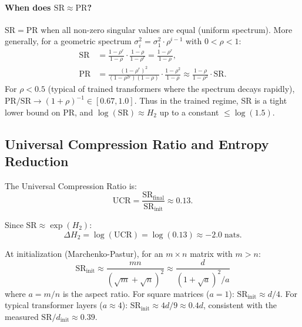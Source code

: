 \paragraph{When does $\mathrm{SR} \approx \mathrm{PR}$?}
$\mathrm{SR} = \mathrm{PR}$ when all non-zero singular values are equal (uniform spectrum). More generally, for a geometric spectrum $\sigma_i^2 = \sigma_1^2 \cdot \rho^{i-1}$ with $0 < \rho < 1$:
\begin{align}
    \mathrm{SR} &= \frac{1-\rho^r}{1-\rho} \cdot \frac{1-\rho}{1-\rho^r} = \frac{1-\rho^r}{1-\rho}, \\
    \mathrm{PR} &= \frac{(1-\rho^r)^2}{(1-\rho^{2r})(1-\rho)} \cdot \frac{1-\rho^2}{1-\rho} \approx \frac{1-\rho}{1-\rho^2} \cdot \mathrm{SR}.
\end{align}
For $\rho < 0.5$ (typical of trained transformers where the spectrum decays rapidly), $\mathrm{PR}/\mathrm{SR} \to (1+\rho)^{-1} \in [0.67, 1.0]$. Thus in the trained regime, SR is a tight lower bound on PR, and $\log(\mathrm{SR}) \approx H_2$ up to a constant $\leq \log(1.5)$.

\subsection{Universal Compression Ratio and Entropy Reduction}

The Universal Compression Ratio is:
\begin{equation}
    \mathrm{UCR} = \frac{\mathrm{SR}_{\mathrm{final}}}{\mathrm{SR}_{\mathrm{init}}} \approx 0.13.
\end{equation}

Since $\mathrm{SR} \approx \exp(H_2)$:
\begin{equation}
    \Delta H_2 = \log(\mathrm{UCR}) = \log(0.13) \approx -2.0 \;\text{nats}.
\end{equation}

At initialization (Marchenko-Pastur), for an $m \times n$ matrix with $m > n$:
\begin{equation}
    \mathrm{SR}_{\mathrm{init}} \approx \frac{mn}{(\sqrt{m} + \sqrt{n})^2} \approx \frac{d}{(1 + \sqrt{a})^2 / a}
\end{equation}
where $a = m/n$ is the aspect ratio. For square matrices ($a = 1$): $\mathrm{SR}_{\mathrm{init}} \approx d/4$. For typical transformer layers ($a \approx 4$): $\mathrm{SR}_{\mathrm{init}} \approx 4d/9 \approx 0.4d$, consistent with the measured $\mathrm{SR}/d_{\mathrm{init}} \approx 0.39$.

